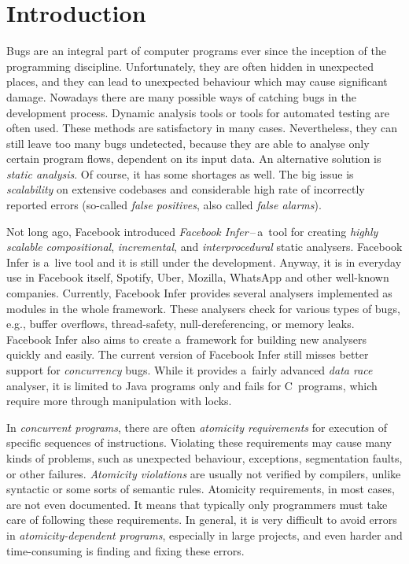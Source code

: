 

\chapter{Introduction}

Bugs are an integral part of computer programs ever since the inception
of the programming discipline. Unfortunately, they are often hidden
in unexpected places, and they can lead to unexpected behaviour which
may cause significant damage. Nowadays there are many possible
ways of catching bugs in the development process. Dynamic analysis
tools or tools for automated testing are often used. These methods
are satisfactory in many cases. Nevertheless, they can still leave
too many bugs undetected, because they are able to analyse only
certain program flows, dependent on its input data. An alternative
solution is \emph{static analysis}. Of course, it has some shortages
as well. The big issue is \emph{scalability} on extensive codebases and
considerable high rate of incorrectly reported errors (so-called
\emph{false positives}, also called \emph{false alarms}).

Not long ago, Facebook introduced \emph{Facebook Infer}\,--\,a~tool for
creating \emph{highly scalable} \emph{compositional}, \emph{incremental},
and \emph{interprocedural} static analysers. Facebook Infer is a~live tool
and it is still under the development. Anyway, it is in everyday use in
Facebook itself, Spotify, Uber, Mozilla, WhatsApp and other well-known
companies. Currently, Facebook Infer provides several analysers implemented
as modules in the whole framework. These analysers check for various types
of bugs, e.g., buffer overflows, thread-safety, null-dereferencing, or
memory leaks. Facebook Infer also aims to create a~framework for building
new analysers quickly and easily. The current version of Facebook Infer still
misses better support for \emph{concurrency} bugs. While it provides a~fairly
advanced \emph{data race} analyser, it is limited to Java programs only and
fails for C~programs, which require more through manipulation with locks.

In \emph{concurrent programs}, there are often \emph{atomicity requirements}
for execution of specific sequences of instructions. Violating these
requirements may cause many kinds of problems, such as unexpected
behaviour, exceptions, segmentation faults, or other failures.
\emph{Atomicity violations} are usually not verified by compilers,
unlike syntactic or some sorts of semantic rules. Atomicity requirements,
in most cases, are not even documented. It means that typically only
programmers must take care of following these requirements. In general,
it is very difficult to avoid errors in \emph{atomicity-dependent
programs}, especially in large projects, and even harder and time-consuming
is finding and fixing these errors.

